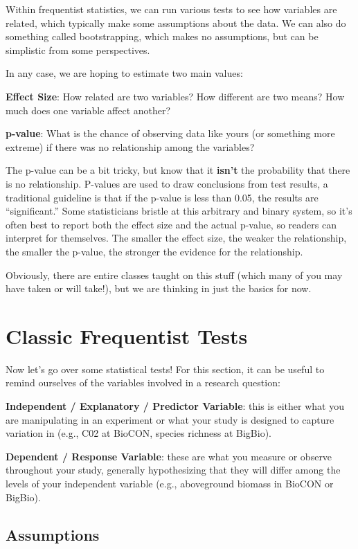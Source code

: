 \documentclass[
  letterpaper,
  DIV=11,
  numbers=noendperiod]{scrreprt}
\begin{document}
Within frequentist statistics, we can run various tests to see how
variables are related, which typically make some assumptions about the
data. We can also do something called bootstrapping, which makes no
assumptions, but can be simplistic from some perspectives.

In any case, we are hoping to estimate two main values:

\textbf{Effect Size}: How related are two variables? How different are
two means? How much does one variable affect another?

\textbf{p-value}: What is the chance of observing data like yours (or
something more extreme) if there was no relationship among the
variables?

The p-value can be a bit tricky, but know that it \textbf{isn't} the
probability that there is no relationship. P-values are used to draw
conclusions from test results, a traditional guideline is that if the
p-value is less than 0.05, the results are ``significant.'' Some
statisticians bristle at this arbitrary and binary system, so it's often
best to report both the effect size and the actual p-value, so readers
can interpret for themselves. The smaller the effect size, the weaker
the relationship, the smaller the p-value, the stronger the evidence for
the relationship.

Obviously, there are entire classes taught on this stuff (which many of
you may have taken or will take!), but we are thinking in just the
basics for now.

\section{Classic Frequentist Tests}\label{classic-frequentist-tests}

Now let's go over some statistical tests! For this section, it can be
useful to remind ourselves of the variables involved in a research
question:

\textbf{Independent / Explanatory / Predictor Variable}: this is either
what you are manipulating in an experiment or what your study is
designed to capture variation in (e.g., C02 at BioCON, species richness
at BigBio).

\textbf{Dependent / Response Variable}: these are what you measure or
observe throughout your study, generally hypothesizing that they will
differ among the levels of your independent variable (e.g., aboveground
biomass in BioCON or BigBio).

\subsection{Assumptions}\label{assumptions}
\end{document}
